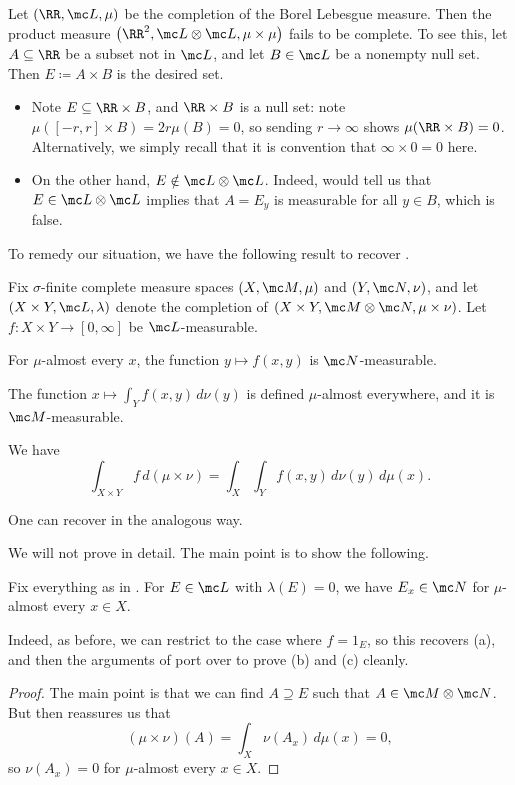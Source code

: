 \documentclass[../notes.tex]{subfiles}
\begin{document}
\begin{example}
	Let $(\RR,\mc L,\mu)$ be the completion of the Borel Lebesgue measure. Then the product measure $\left(\RR^2,\mc L\otimes\mc L,\mu\times\mu\right)$ fails to be complete. To see this, let $A\subseteq\RR$ be a subset not in $\mc L$, and let $B\in\mc L$ be a nonempty null set. Then $E\coloneqq A\times B$ is the desired set.
	\begin{itemize}
		\item Note $E\subseteq\RR\times B$, and $\RR\times B$ is a null set: note $\mu([-r,r]\times B)=2r\mu(B)=0$, so sending $r\to\infty$ shows $\mu(\RR\times B)=0$. Alternatively, we simply recall that it is convention that $\infty\times0=0$ here.
		\item On the other hand, $E\notin\mc L\otimes\mc L$. Indeed,  would tell us that $E\in\mc L\otimes\mc L$ implies that $A=E_y$ is measurable for all $y\in B$, which is false.
	\end{itemize}
\end{example}
To remedy our situation, we have the following result to recover .
\begin{theorem} \label{thm:complete-tonelli}
	Fix $\sigma$-finite complete measure spaces $(X,\mc M,\mu)$ and $(Y,\mc N,\nu)$, and let $(X\times Y,\mc L,\lambda)$ denote the completion of $(X\times Y,\mc M\otimes\mc N,\mu\times\nu)$. Let $f\colon X\times Y\to[0,\infty]$ be $\mc L$-measurable.
	\begin{listalph}
		\item For $\mu$-almost every $x$, the function $y\mapsto f(x,y)$ is $\mc N$-measurable.
		\item The function $x\mapsto\int_Yf(x,y)\,d\nu(y)$ is defined $\mu$-almost everywhere, and it is $\mc M$-measurable.
		\item We have
		\[\int_{X\times Y}f\,d(\mu\times\nu)=\int_X\int_Yf(x,y)\,d\nu(y)\,d\mu(x).\]
	\end{listalph}
\end{theorem}
One can recover  in the analogous way.

We will not prove  in detail. The main point is to show the following.
\begin{lemma}
	Fix everything as in . For $E\in\mc L$ with $\lambda(E)=0$, we have $E_x\in\mc N$ for $\mu$-almost every $x\in X$.
\end{lemma}
Indeed, as before, we can restrict to the case where $f=1_E$, so this recovers (a), and then the arguments of  port over to prove (b) and (c) cleanly.
\begin{proof}
	The main point is that we can find $A\supseteq E$ such that $A\in\mc M\otimes\mc N$. But then  reassures us that
	\[(\mu\times\nu)(A)=\int_X\nu(A_x)\,d\mu(x)=0,\]
	so $\nu(A_x)=0$ for $\mu$-almost every $x\in X$.
\end{proof}
\end{document}
